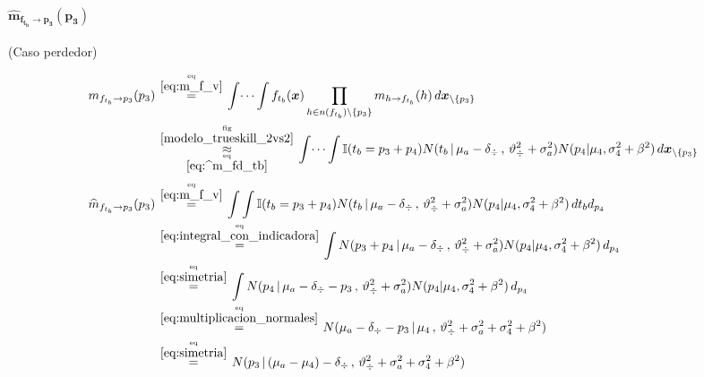 \documentclass[article]{jss}
\newcommand\hfrac[2]{\genfrac{}{}{0pt}{}{#1}{#2}} %
\begin{document}
\begin{appendix}
\paragraph{$\bm{\widehat{m}_{f_{t_b} \rightarrow p_3}(p_3)}$} (Caso perdedor)

\begin{equation}\label{eq:^m_ftb_p}
\begin{split}
m_{f_{t_b} \rightarrow p_3}(p_3) & \overset{\hfrac{\text{eq}}{\ref{eq:m_f_v}}}{=} \int \dots \int f_{t_b}(\bm{x}) \prod_{h \in n(f_{t_b}) \setminus \{p_3\} } m_{h \rightarrow f_{t_b}}(h) \, d\bm{x}_{\setminus \{p_3\} }  \\
&\overset{\hfrac{\text{fig}}{\ref{modelo_trueskill_2vs2}}}{\underset{\hfrac{\text{eq}}{\ref{eq:^m_fd_tb}}}{\approx}}  \int \dots \int \mathbb{I}(t_b = p_3 + p_4) N(t_b \, | \, \mu_a - \delta_{\div} \, , \, \vartheta_{\div}^2 + \sigma_a^2) N(p_4 | \mu_4 , \sigma_4^2 + \beta^2)  \, d\bm{x}_{\setminus \{p_3\} } \\[0.1cm]
\widehat{m}_{f_{t_b} \rightarrow p_3}(p_3)  & \overset{\hfrac{\text{eq}}{\ref{eq:m_f_v}}}{=} \int \int \mathbb{I}(t_b = p_3 + p_4) N(t_b \, | \, \mu_a - \delta_{\div} \, , \, \vartheta_{\div}^2 + \sigma_a^2) N(p_4 | \mu_4 , \sigma_4^2 + \beta^2) \, d{t_b} d_{p_4} \\
& \overset{\hfrac{\text{eq}}{\ref{eq:integral_con_indicadora}}}{=} \int N(p_3 + p_4 \, | \, \mu_a - \delta_{\div} \, , \, \vartheta_{\div}^2 + \sigma_a^2) N(p_4 | \mu_4 , \sigma_4^2 + \beta^2) \, d_{p_4} \\
& \overset{\hfrac{\text{eq}}{\ref{eq:simetria}}}{=} \int N(p_4 \, | \, \mu_a - \delta_{\div} - p_3 \, , \, \vartheta_{\div}^2 + \sigma_a^2) N(p_4 | \mu_4 , \sigma_4^2 + \beta^2) \, d_{p_4} \\
& \overset{\hfrac{\text{eq}}{\ref{eq:multiplicacion_normales}}}{=} N(\mu_a - \delta_{\div} - p_3  \,|\, \mu_4 \, , \, \vartheta_{\div}^2 + \sigma_a^2 + \sigma_4^2 + \beta^2)   \\
& \overset{\hfrac{\text{eq}}{\ref{eq:simetria}}}{=}   N(  p_3  \,|\, (\mu_a - \mu_4)  - \delta_{\div} \, , \, \vartheta_{\div}^2 + \sigma_a^2 + \sigma_4^2 + \beta^2)  \\
\end{split}
\end{equation}































\end{appendix}
\end{document}
